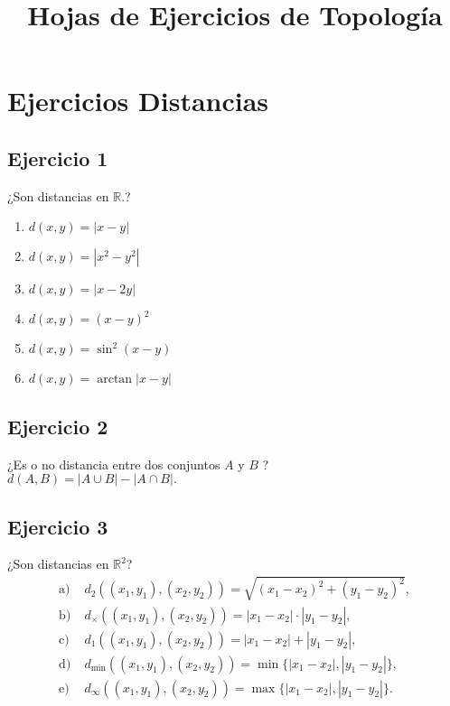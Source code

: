 \documentclass[12pt,a4paper]{article}
\title{Hojas de Ejercicios de Topología}
\author{}
\date{}
\begin{document}
\maketitle
\setlength{\parskip}{0.8em}

\section*{Ejercicios Distancias}

\subsection*{Ejercicio 1}
¿Son distancias en $\mathbb{R}$.?
\begin{enumerate}
    \item $d(x,y)=|x-y|$
    \item $d(x,y)=|x^2-y^2|$
    \item $d(x,y)=|x-2y|$
    \item $d(x,y)=(x-y)^2$
    \item $d(x,y)=\sin^2(x-y)$
    \item $d(x,y)=\arctan|x-y|$
\end{enumerate}

\vspace{10cm}

\subsection*{Ejercicio 2}
¿Es o no distancia entre dos conjuntos $A$ y $B$ ? \\
$d(A,B)=|A\cup B|-|A\cap B|.$

\vspace{10cm}

\subsection*{Ejercicio 3}
¿Son distancias en $\mathbb{R}^2$?
\[
\begin{aligned}
\text{a)}\;& d_2((x_1,y_1),(x_2,y_2))=\sqrt{(x_1-x_2)^2+(y_1-y_2)^2},\\
\text{b)}\;& d_\times((x_1,y_1),(x_2,y_2))=|x_1-x_2|\cdot|y_1-y_2|,\\
\text{c)}\;& d_1((x_1,y_1),(x_2,y_2))=|x_1-x_2|+|y_1-y_2|,\\
\text{d)}\;& d_{\min}((x_1,y_1),(x_2,y_2))=\min\{|x_1-x_2|,|y_1-y_2|\},\\
\text{e)}\;& d_\infty((x_1,y_1),(x_2,y_2))=\max\{|x_1-x_2|,|y_1-y_2|\}.
\end{aligned}
\]
\end{document}
